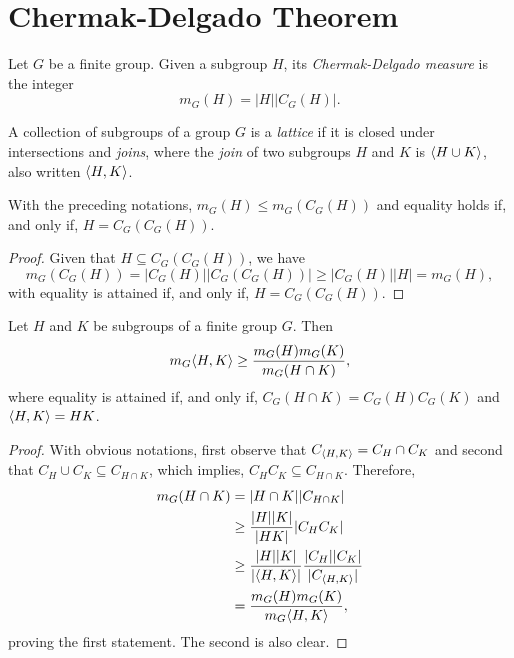 \section{Chermak-Delgado Theorem}

\begin{defn}
    Let\/ $G$ be a finite group. Given a subgroup $H$, its \textsl{Chermak-Delgado measure} is the integer
    $$
        m_G(H) = |H||C_G(H)|.
    $$
\end{defn}

\begin{defn}
    A collection of subgroups of a group $G$ is a \textsl{lattice} if it is closed under intersections and \textsl{joins}, where the \textsl{join} of two subgroups $H$ and $K$ is $\langle H\cup K\rangle$, also written $\langle H,K\rangle$.
\end{defn}

\begin{lem}\label{m_G-inequality-1}
    With the preceding notations, $m_G(H)\le m_G(C_G(H))$ and equality holds if, and only if, $H=C_G(C_G(H))$.
\end{lem}

\begin{proof} Given that $H\subseteq C_G(C_G(H))$, we have
$$
    m_G(C_G(H))=|C_G(H)||C_G(C_G(H))|\ge |C_G(H)||H|=m_G(H),
$$
with equality is attained if, and only if, $H=C_G(C_G(H))$.  \end{proof} 

\begin{lem}\label{m_G-inequality-2}
    Let\/ $H$ and\/ $K$ be subgroups of a finite group $G$. Then
    $$
        m_G\langle H,K\rangle \ge \frac{m_G(H)m_G(K)}{m_G(H\cap K)},
    $$
    where equality is attained if, and only if, $C_G(H\cap K) = C_G(H)C_G(K)$ and\/ $\langle H,K\rangle = HK$.
\end{lem}

\begin{proof} With obvious notations, first observe that $C_{\langle H,K\rangle}=C_H\cap C_K$ and second that $C_H\cup C_K\subseteq C_{H\cap K}$, which implies, $C_HC_K\subseteq C_{H\cap K}$. Therefore,
\begin{align*}
    m_G(H\cap K) &= |H\cap K||C_{H\cap K}|\\
        &\ge\frac{|H||K|}{|HK|}|C_HC_K|\\
        &\ge \frac{|H||K|}{|\langle H,K\rangle|}\frac{|C_H||C_K|}{|C_{\langle H,K\rangle}|}\\
        &= \frac{m_G(H)m_G(K)}{m_G\langle H,K\rangle},
\end{align*}
proving the first statement. The second is also clear.  \end{proof}

